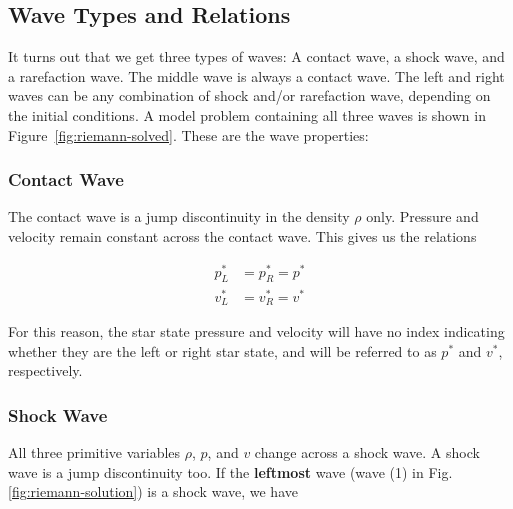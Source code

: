 \subsection{Wave Types and Relations}





It turns out that we get three types of waves: A contact wave, a shock wave,
and a rarefaction wave. The middle wave is always a contact wave. The left and
right waves can be any combination of shock and/or rarefaction wave, depending
on the initial conditions. A model problem containing all three waves is shown
in Figure~\ref{fig:riemann-solved}. These are the wave properties:






\subsubsection{Contact Wave}

The contact wave is a jump discontinuity in the density $\rho$ only.
Pressure and velocity remain constant across the contact wave.
This gives us the relations


\begin{align}
	p^*_L &= p^*_R = p^*\\
	v^*_L &= v^*_R = v^*
\end{align}

For this reason, the star state pressure and velocity will have no index
indicating whether they are the left or right star state, and will be referred
to as $p^*$ and $v^*$, respectively.









\subsubsection{Shock Wave}

All three primitive variables $\rho$, $p$, and $v$ change across a shock wave.
A shock wave is a jump discontinuity too. If the \textbf{leftmost} wave (wave
(1) in Fig. \ref{fig:riemann-solution}) is a shock wave, we have

